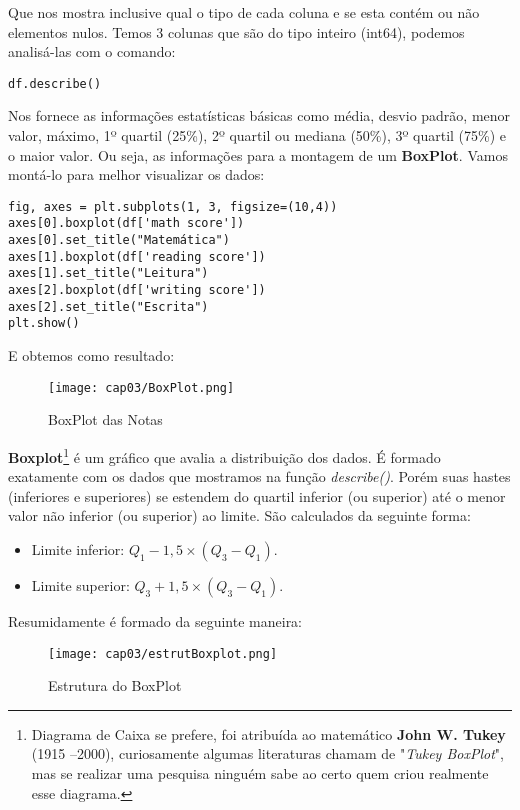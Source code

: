Que nos mostra inclusive qual o tipo de cada coluna e se esta contém ou não elementos nulos. Temos 3 colunas que são do tipo inteiro (int64), podemos analisá-las com o comando:
\begin{lstlisting}
df.describe()
\end{lstlisting}

Nos fornece as informações estatísticas básicas como média, desvio padrão, menor valor, máximo, 1º quartil (25\%), 2º quartil ou mediana (50\%), 3º quartil (75\%) e o maior valor. Ou seja, as informações para a montagem de um \textbf{BoxPlot}. Vamos montá-lo para melhor visualizar os dados:
\begin{lstlisting}
fig, axes = plt.subplots(1, 3, figsize=(10,4))
axes[0].boxplot(df['math score'])
axes[0].set_title("Matemática")
axes[1].boxplot(df['reading score'])
axes[1].set_title("Leitura")
axes[2].boxplot(df['writing score'])
axes[2].set_title("Escrita")
plt.show()
\end{lstlisting}

E obtemos como resultado:
\begin{figure}[H]
	\centering
	\texttt{[image: cap03/BoxPlot.png]}
	\caption{BoxPlot das Notas}
\end{figure}

\textbf{Boxplot}\footnote{Diagrama de Caixa se prefere, foi atribuída ao matemático \textbf{John W. Tukey} (1915 –2000), curiosamente algumas literaturas chamam de "\textit{Tukey BoxPlot}", mas se realizar uma pesquisa ninguém sabe ao certo quem criou realmente esse diagrama.} é um gráfico que avalia a distribuição dos dados. É formado exatamente com os dados que mostramos na função \textit{describe()}. Porém suas hastes (inferiores e superiores) se estendem do quartil inferior (ou superior) até o menor valor não inferior (ou superior) ao limite. São calculados da seguinte forma: \vspace{-1em}
\begin{itemize}
	\item Limite inferior: $Q_1 - 1,5 \times (Q_3 - Q_1)$.
	\item Limite superior: $Q_3 + 1,5 \times (Q_3 - Q_1)$.
\end{itemize}

Resumidamente é formado da seguinte maneira:
\begin{figure}[H]
	\centering
	\texttt{[image: cap03/estrutBoxplot.png]}
	\caption{Estrutura do BoxPlot}
\end{figure}

